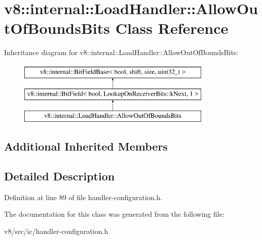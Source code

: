 \hypertarget{classv8_1_1internal_1_1LoadHandler_1_1AllowOutOfBoundsBits}{}\section{v8\+:\+:internal\+:\+:Load\+Handler\+:\+:Allow\+Out\+Of\+Bounds\+Bits Class Reference}
\label{classv8_1_1internal_1_1LoadHandler_1_1AllowOutOfBoundsBits}
Inheritance diagram for v8\+:\+:internal\+:\+:Load\+Handler\+:\+:Allow\+Out\+Of\+Bounds\+Bits\+:\begin{figure}[H]
\begin{center}
\leavevmode
\includegraphics[height=3.000000cm]{classv8_1_1internal_1_1LoadHandler_1_1AllowOutOfBoundsBits}
\end{center}
\end{figure}
\subsection*{Additional Inherited Members}


\subsection{Detailed Description}


Definition at line 89 of file handler-\/configuration.\+h.



The documentation for this class was generated from the following file\+:\begin{DoxyCompactItemize}
\item 
v8/src/ic/handler-\/configuration.\+h\end{DoxyCompactItemize}

